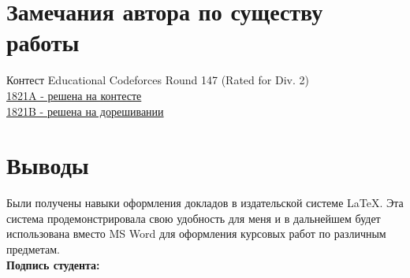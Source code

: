 \documentclass[12pt, letterpaper]{article}
\begin{document}
\section{Замечания автора по существу работы}
Контест Educational Codeforces Round 147 (Rated for Div. 2) \\
\href{https://codeforces.com/contest/1821/submission/202878443}{1821A - решена на контесте} \\
\href{https://codeforces.com/contest/1821/submission/207354318}{1821B - решена на дорешивании} \\
\section{Выводы}
Были получены навыки оформления докладов в издательской системе \LaTeX{}. Эта система продемонстрировала свою удобность для меня и в дальнейшем будет использована вместо MS Word для оформления курсовых работ по различным предметам. \\
\flushright \textbf{Подпись студента:} \underline{\hspace{3cm}}
\end{document}
